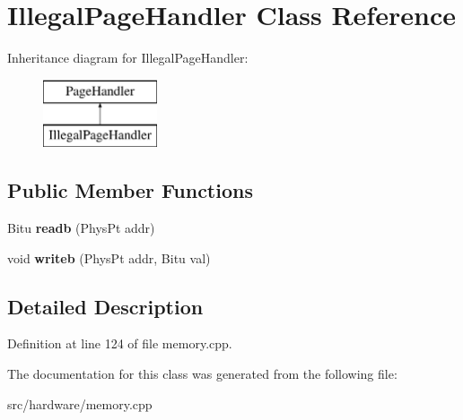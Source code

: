 \hypertarget{classIllegalPageHandler}{\section{Illegal\-Page\-Handler Class Reference}
\label{classIllegalPageHandler}
}
Inheritance diagram for Illegal\-Page\-Handler\-:\begin{figure}[H]
\begin{center}
\leavevmode
\includegraphics[height=2.000000cm]{classIllegalPageHandler}
\end{center}
\end{figure}
\subsection*{Public Member Functions}
\begin{DoxyCompactItemize}
\item 
\hypertarget{classIllegalPageHandler_a76f1d0cf8cacaa7a54d9cd87dcd77aa3}{Bitu {\bfseries readb} (Phys\-Pt addr)}\label{classIllegalPageHandler_a76f1d0cf8cacaa7a54d9cd87dcd77aa3}

\item 
\hypertarget{classIllegalPageHandler_a061eb7abdb84d8bc85d8c83fecbe371e}{void {\bfseries writeb} (Phys\-Pt addr, Bitu val)}\label{classIllegalPageHandler_a061eb7abdb84d8bc85d8c83fecbe371e}

\end{DoxyCompactItemize}


\subsection{Detailed Description}


Definition at line 124 of file memory.\-cpp.



The documentation for this class was generated from the following file\-:\begin{DoxyCompactItemize}
\item 
src/hardware/memory.\-cpp\end{DoxyCompactItemize}
